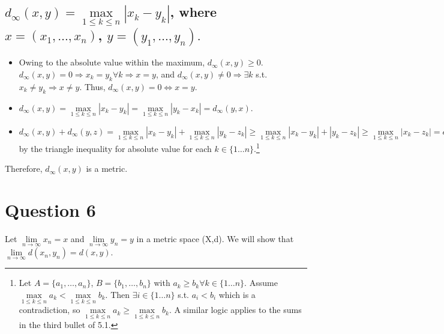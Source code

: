 \documentclass[11pt]{article} %
\begin{document}
\subsection{$d_\infty (x,y) = \max\limits_{1 \leq k \leq n} |x_k - y_k |$, where $x = (x_1,\dots ,x_n)$, $y = (y_1,\dots ,y_n).$}
\begin{itemize}
\item
Owing to the absolute value within the maximum, $d_\infty(x,y) \geq 0$.  $d_\infty(x,y) = 0 \Rightarrow x_k = y_k \forall k \Rightarrow x = y$, and $d_\infty(x,y) \neq 0 \Rightarrow \exists k$ s.t. $x_k \neq y_k \Rightarrow x \neq y$. Thus, $d_\infty(x,y) = 0 \iff x = y$. 
\item
$d_\infty(x,y) = \max\limits_{1 \leq k \leq n} |x_k - y_k | = \max\limits_{1 \leq k \leq n} |y_k - x_k | = d_\infty(y,x)$. 
\item
 $d_\infty(x,y) + d_\infty(y,z) =   \max\limits_{1 \leq k \leq n} |x_k - y_k |+ \max\limits_{1 \leq k \leq n} |y_k - z_k | \geq  \max\limits_{1 \leq k \leq n}  |x_k - y_k |+  |y_k - z_k | \geq  \max\limits_{1 \leq k \leq n} |x_k - z_k | = d_\infty(x,z) $ by the triangle inequality for absolute value for each $k \in \{ 1 \dots n \}.$\footnote{Let $A = \{a_1,\dots ,a_n \}$, $B = \{b_1,\dots ,b_n \}$ with $a_k\geq b_k \forall k \in \{ 1 \dots n\}.$ Assume $\max\limits_{1 \leq k \leq n} a_k < \max\limits_{1 \leq k \leq n} b_k$. Then $\exists i \in \{ 1 \dots n \}$ s.t. $a_i < b_i$ which is a contradiction, so $\max\limits_{1 \leq k \leq n} a_k \geq \max\limits_{1 \leq k \leq n} b_k$. A similar logic applies to the sums in the third bullet of 5.1.}
\end{itemize}
Therefore, $d_\infty(x,y)$ is a metric.
\section{Question 6}
Let $\lim\limits_{n \rightarrow \infty} x_n = x$ and $\lim\limits_{n \rightarrow \infty} y_n = y$ in a metric space (X,d). We will show that $\lim\limits_{n \rightarrow \infty} d(x_n,y_n) = d(x,y)$.
\end{document}

